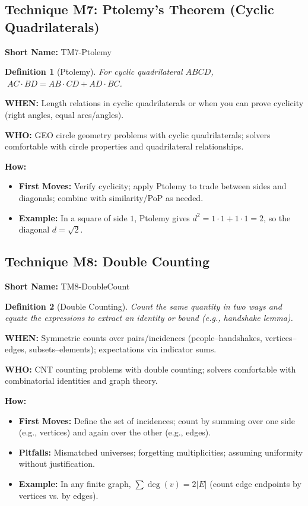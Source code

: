 \documentclass[12pt]{article}
\newtheorem{definition}{Definition}[section]
\begin{document}
\subsection{Technique M7: Ptolemy's Theorem (Cyclic Quadrilaterals)}
\textbf{Short Name:} TM7-Ptolemy

\begin{definition}[Ptolemy]
For cyclic quadrilateral $ABCD$, $\; AC\cdot BD = AB\cdot CD + AD\cdot BC$.
\end{definition}

\textbf{WHEN:} Length relations in cyclic quadrilaterals or when you can prove cyclicity (right angles, equal arcs/angles).

\textbf{WHO:} GEO circle geometry problems with cyclic quadrilaterals; solvers comfortable with circle properties and quadrilateral relationships.

\textbf{How:}
\begin{itemize}
    \item \textbf{First Moves:} Verify cyclicity; apply Ptolemy to trade between sides and diagonals; combine with similarity/PoP as needed.
    \item \textbf{Example:} In a square of side $1$, Ptolemy gives $d^2=1\cdot 1+1\cdot 1=2$, so the diagonal $d=\sqrt{2}$.
\end{itemize}

\subsection{Technique M8: Double Counting}
\textbf{Short Name:} TM8-DoubleCount

\begin{definition}[Double Counting]
Count the same quantity in two ways and equate the expressions to extract an identity or bound (e.g., handshake lemma).
\end{definition}

\textbf{WHEN:} Symmetric counts over pairs/incidences (people–handshakes, vertices–edges, subsets–elements); expectations via indicator sums.

\textbf{WHO:} CNT counting problems with double counting; solvers comfortable with combinatorial identities and graph theory.

\textbf{How:}
\begin{itemize}
    \item \textbf{First Moves:} Define the set of incidences; count by summing over one side (e.g., vertices) and again over the other (e.g., edges).
    \item \textbf{Pitfalls:} Mismatched universes; forgetting multiplicities; assuming uniformity without justification.
    \item \textbf{Example:} In any finite graph, $\sum \deg(v)=2|E|$ (count edge endpoints by vertices vs. by edges).
\end{itemize}
\end{document}
